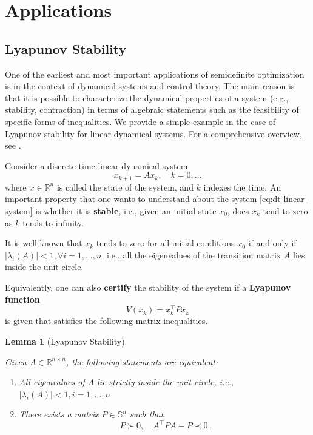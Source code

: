 \documentclass[
]{book}
\newtheorem{lemma}{Lemma}[chapter]
\theoremstyle{definition}
\theoremstyle{definition}
\theoremstyle{definition}
\theoremstyle{definition}
\theoremstyle{remark}
\begin{document}
\section{Applications}\label{applications}

\subsection{Lyapunov Stability}\label{LyapunovLinearSystem}

One of the earliest and most important applications of semidefinite optimization is in the context of dynamical systems and control theory. The main reason is that it is possible to characterize the dynamical properties of a system (e.g., stability, contraction) in terms of algebraic statements such as the feasibility of specific forms of inequalities. We provide a simple example in the case of Lyapunov stability for linear dynamical systems. For a comprehensive overview, see \citep{boyd94book-lmi}.

Consider a discrete-time linear dynamical system
\begin{equation}
x_{k+1} = A x_k,\quad k=0,\dots
\label{eq:dt-linear-system}
\end{equation}
where \(x \in \mathbb{R}^{n}\) is called the state of the system, and \(k\) indexes the time. An important property that one wants to understand about the system \eqref{eq:dt-linear-system} is whether it is \textbf{stable}, i.e., given an initial state \(x_0\), does \(x_k\) tend to zero as \(k\) tends to infinity.

It is well-known that \(x_k\) tends to zero for all initial conditions \(x_0\) if and only if \(|\lambda_i(A)| < 1, \forall i=1,\dots,n\), i.e., all the eigenvalues of the transition matrix \(A\) lies inside the unit circle.

Equivalently, one can also \textbf{certify} the stability of the system if a \textbf{Lyapunov function}
\begin{equation}
V(x_k) = x_k^\top P x_k
\label{eq:Lyapunov-function}
\end{equation}
is given that satisfies the following matrix inequalities.

\begin{lemma}[Lyapunov Stability]
\protect\hypertarget{lem:LyapunovStability}{}\label{lem:LyapunovStability}

Given \(A \in \mathbb{R}^{n \times n}\), the following statements are equivalent:

\begin{enumerate}
\def\labelenumi{\arabic{enumi}.}
\item
  All eigenvalues of \(A\) lie strictly inside the unit circle, i.e., \(|\lambda_i(A)| < 1, i=1,\dots,n\)
\item
  There exists a matrix \(P \in \mathbb{S}^{n}\) such that
  \[
  P \succ 0, \quad A^\top P A - P \prec 0.
  \]
\end{enumerate}

\end{lemma}
\end{document}
